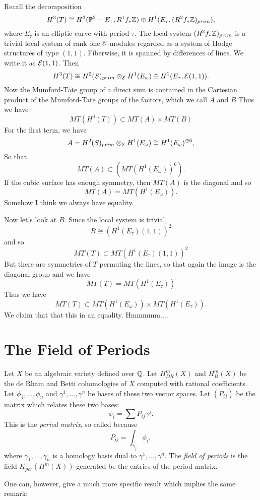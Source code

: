 
Recall the decomposition \[ H^3(T) \cong H^3({ \mathbb P }^2 - E_\tau, R^1f_* { \mathbb Z }) \oplus
H^1(E_\tau, (R^2f_*{ \mathbb Z })_{prim}), \] where $E_\tau$ is an elliptic curve with period
$\tau$. The local system $(R^2f_*{ \mathbb Z })_{prim}$ is a trivial local system of rank one
${ \mathcal E }$-modules regarded as a system of Hodge structures of type $(1,1)$. Fiberwise, it
is spanned by differences of lines. We write it as ${ \mathcal E }(1,1)$. Then \[ H^3(T) \cong
H^2(S)_{prim} \otimes_{ \mathcal E } H^1(E_\omega) \oplus H^1(E_\tau,{ \mathcal E }(1,1)). \] Now the
Mumford-Tate group of a direct sum is contained in the Cartesian product of the
Mumford-Tate groups of the factors, which we call $A$ and $B$ Thus we have \[ MT(
H^3(T) ) \subset MT( A ) \times MT( B ) \] For the first term, we have \[ A =
H^2(S)_{prim} \otimes_{ \mathcal E } H^1(E_\omega) \cong H^1(E_\omega) ^{\oplus 6}, \] So that \[
MT(A) \subset (MT(H^1(E_\omega))^6). \] If the cubic surface has enough symmetry, then
$MT(A)$ is the diagonal and so \[ MT(A) = MT(H^1(E_\omega)). \] Somehow I think we
always have equality.

Now let's look at $B$. Since the local system is trivial, \[ B \cong
(H^1(E_\tau)(1,1))^2 \] and so \[ MT(T) \subset MT(H^1(E_\tau)(1,1))^2 \] But there are
symmetries of $T$ permuting the lines, so that again the image is the diagonal group
and we have \[ MT(T) = MT(H^1(E_\tau)) \] Thus we have \[ MT(T) \subset
MT(H^1(E_\omega)) \times MT(H^1(E_\tau)). \] We claim that that this in an equality.
Hmmmmm....

\section{The Field of Periods}

Let $X$ be an algebraic variety defined over ${ \mathbb Q }$. Let $H^m_{DR}(X)$ and $H^m_B(X)$ be
the de Rham and Betti cohomologies of $X$ computed with rational coefficients. Let
$\phi_1, \ldots, \phi_n$ and $\gamma^1, \ldots, \gamma^n$ be bases of these two vector
spaces. Let $(P_{ij})$ be the matrix which relates these two bases: \[ \phi_i = \sum
P_{ij}\gamma^j. \] This is the \emph{period matrix}, so called because \[ P_{ij} =
\int_{\gamma_j}\phi_i, \] where $\gamma_1, \ldots, \gamma_n$ is a homology basis dual
to $\gamma^1, \ldots, \gamma^n$. The \emph{field of periods} is the field
$K_{per}(H^m(X))$ generated be the entries of the period matrix.

\noindent One can, however, give a much more specific result which implies the same
remark:



